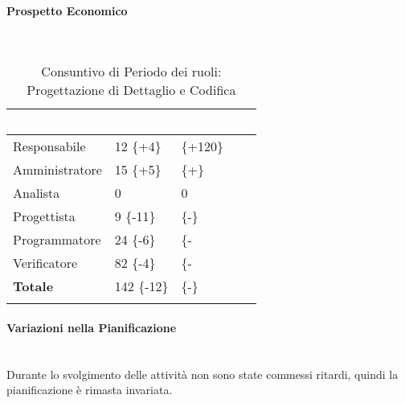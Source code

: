 \paragraph{Prospetto Economico} ~\\

\begin{longtable}{| C{.30\textwidth}| C{.15\textwidth}| C{.20\textwidth}|}
	\hline
	\textbf{\textcolor{white}{Ruolo}} & \textbf{\textcolor{white}{Ore}} & \textbf{\textcolor{white}{Costo 	in \euro}} \\
	\hline 
	Responsabile & 12 \{+4\} &  \{+120\} \\
	\hline
	Amministratore & 15 \{+5\} &   \{+\}\\
	\hline
	Analista & 0 & 0 \\
	\hline
	Progettista & 9 \{-11\} &   \{-\}\\
	\hline
	Programmatore & 24 \{-6\} &  \{- \\
	\hline 
	Verificatore & 82 \{-4\} &  \{-\\
	\hline
	\textbf{Totale} & 142 \{-12\} &  \{-\}\\
	\hline 
	
	\caption{Consuntivo di Periodo dei ruoli: Progettazione di Dettaglio e Codifica}
	\label{Distribuzione ruoli pdc}
\end{longtable}

\paragraph{Variazioni nella Pianificazione} ~\\
Durante lo svolgimento delle attività non sono state commessi ritardi, quindi la pianificazione è rimasta invariata.

